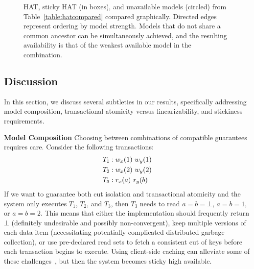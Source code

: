 \begin{figure}[t!]
\label{fig:hat-order}
\caption{HAT, sticky HAT (in boxes), and unavailable models (circled)
  from Table~\protect\ref{table:hatcompared} compared
  graphically. Directed edges represent ordering by model
  strength. Models that do not share a common ancestor can be
  simultaneously achieved, and the resulting availability is that of
  the weakest available model in the combination.}
\label{fig:hatcompared}
\end{figure}\vspace{-1em}


\subsection{Discussion}
\label{sec:discussion}

In this section, we discuss several subtleties in our results,
specifically addressing model composition, transactional atomicity
versus linearizability, and stickiness requirements.

\vspace{.5em}\noindent\textbf{Model Composition} Choosing between
combinations of compatible guarantees requires care. Consider the
following transactions:
\begin{align*}
\small
T_1 &: w_x(1)~w_y(1)
\\T_2 &: w_x(2)~w_y(2)
\\T_3 &: r_x(a)~r_y(b)
\end{align*}
If we want to guarantee both cut isolation and transactional atomicity
and the system only executes $T_1$, $T_2$, and $T_3$, then $T_3$ needs
to read $a=b=\bot$, $a=b=1$, or $a=b=2$. This means that either the
implementation should frequently return $\bot$ (definitely undesirable
and possibly non-convergent), keep multiple versions of each data item
(necessitating potentially complicated distributed garbage
collection), or use pre-declared read sets to fetch a consistent cut
of keys before each transaction begins to execute. Using client-side
caching can alleviate some of these challenges~\cite{bolton, swift},
but then the system becomes sticky high available.

